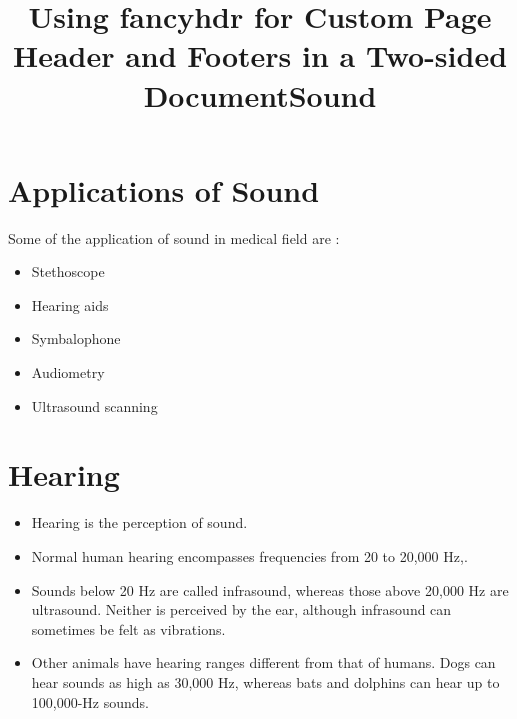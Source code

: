 \documentclass[12pt]{book}
\title{Using fancyhdr for Custom Page Header and Footers in a Two-sided Document}
\begin{document}
\title{Sound}
\maketitle
\tableofcontents
\newpage
\setcounter{page}{1}
\graphicspath{ {../} }
\chapter{Applications of Sound}
Some of the application of sound in medical field are :
\begin{itemize}
\item Stethoscope
\item Hearing aids
\item Symbalophone
\item Audiometry
\item Ultrasound scanning
\end{itemize}


\chapter{Hearing}
\begin{itemize}
\item Hearing is the perception of sound.
\item Normal human hearing encompasses frequencies from 20 to 20,000 Hz,.
\item Sounds below 20 Hz are called infrasound, whereas those above 20,000 Hz are ultrasound. Neither is perceived by the ear, although infrasound can sometimes be felt as vibrations.
\item  Other animals have hearing ranges different from that of humans. Dogs can hear sounds as high as 30,000 Hz, whereas bats and dolphins can hear up to 100,000-Hz sounds.
\end{itemize}
\end{document}
